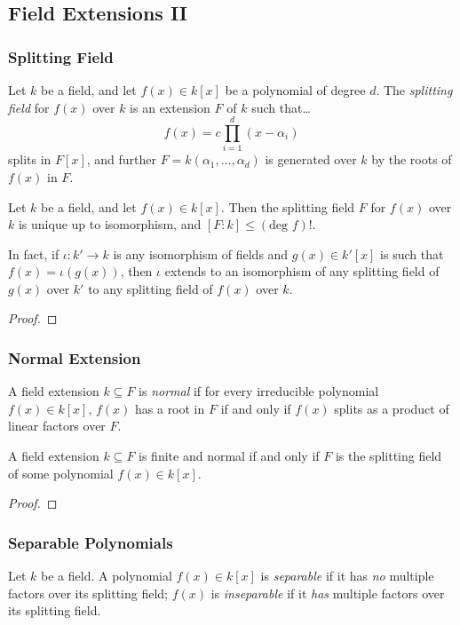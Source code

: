 \subsection{Field Extensions II}

\subsubsection{Splitting Field}
Let $k$ be a field, and let $f(x) \in k[x]$ be a polynomial of degree $d$.
The \emph{splitting field} for $f(x)$ over $k$ is an extension $F$ of $k$ such that\dots
$$f(x) = c \prod^d_{i=1}(x - \alpha_i)$$
splits in $F[x]$, and further $F = k(\alpha_1, \dots, \alpha_d)$ is generated over $k$ by
the roots of $f(x)$ in $F$.

\begin{lemma}
Let $k$ be a field, and let $f(x) \in k[x]$. Then the splitting field $F$ for $f(x)$ over $k$ is
unique up to isomorphism, and $[F:k] \leq (\textrm{deg } f)!$.

In fact, if $\iota : k' \rightarrow k$ is any isomorphism of fields and $g(x) \in k'[x]$ is such that
$f(x) = \iota(g(x))$, then $\iota$ extends to an isomorphism of any splitting field of $g(x)$ over $k'$
to any splitting field of $f(x)$ over $k$.
\end{lemma}

\begin{proof}

\end{proof}

\subsubsection{Normal Extension}
A field extension $k \subseteq F$ is \emph{normal} if for every irreducible polynomial $f(x) \in k[x]$,
$f(x)$ has a root in $F$ if and only if $f(x)$ splits as a product of linear factors over $F$.

\begin{theorem}
A field extension $k \subseteq F$ is finite and normal if and only if $F$ is the splitting field of some
polynomial $f(x) \in k[x]$.
\end{theorem}

\begin{proof}

\end{proof}

\subsubsection{Separable Polynomials}
Let $k$ be a field. A polynomial $f(x) \in k[x]$ is \emph{separable} if it has \emph{no} multiple
factors over its splitting field; $f(x)$ is \emph{inseparable} if it \emph{has} multiple factors over
its splitting field.

